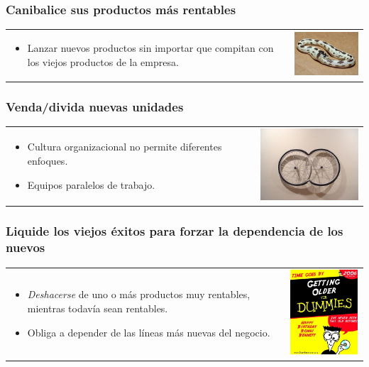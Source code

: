 \frame
{
\frametitle{Canibalice sus productos más rentables}
\begin{table}
\begin{tabular}{p{7cm}p{3cm}}
\begin{itemize}
    \item Lanzar nuevos productos sin importar que compitan con los viejos
    productos de la empresa.
\end{itemize}
&
\vspace{1.5cm}
\includegraphics[width=4cm]{img/ouroboros.jpg}\\
\end{tabular}
\end{table}
}
\frame
{
\frametitle{Venda/divida nuevas unidades}
\begin{table}
\begin{tabular}{p{7cm}p{3cm}}
\begin{itemize}
    \item Cultura organizacional no permite diferentes enfoques.
    \item Equipos paralelos de trabajo.
\end{itemize}
&
\vspace{1.5cm}
\includegraphics[width=4cm]{img/mitosis.jpg}\\
\end{tabular}
\end{table}
}
\frame
{
\frametitle{Liquide los viejos éxitos para forzar la dependencia de los nuevos}
\begin{table}
\begin{tabular}{p{7cm}p{3cm}}
\begin{itemize}
    \item \textit{Deshacerse} de uno o más productos muy rentables, mientras
    todavía sean rentables.
    \item Obliga a depender de las líneas más nuevas del negocio.
\end{itemize}
&
\vspace{1.5cm}
\includegraphics[width=4cm]{img/getting_older.jpg}\\
\end{tabular}
\end{table}
}

